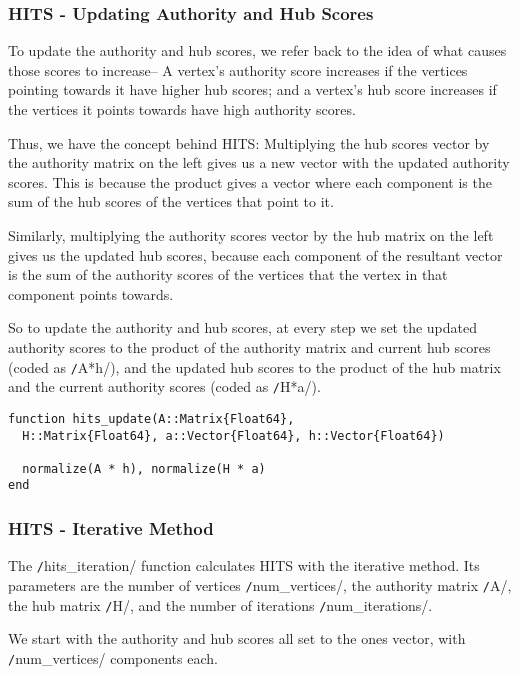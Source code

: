 \documentclass[12pt, titlepage, twoside]{amsart}
\theoremstyle{remark}
\begin{document}
\subsubsection{HITS - Updating Authority and Hub Scores}

To update the authority and hub scores, we refer back to the idea of what causes those scores to increase--
A vertex's authority score increases if the vertices pointing towards it have higher hub scores;
and a vertex's hub score increases if the vertices it points towards have high authority scores.

Thus, we have the concept behind HITS:
Multiplying the hub scores vector by the authority matrix on the left gives us a new vector with the updated authority scores.
This is because the product gives a vector where each component is the sum of the hub scores of the vertices that point to it.

Similarly, multiplying the authority scores vector by the hub matrix on the left gives us the updated hub scores,
because each component of the resultant vector is the sum of the authority scores of the vertices that the vertex in that component points towards.

So to update the authority and hub scores, at every step we set the updated authority scores to the product of the authority matrix and current hub scores (coded as \texttt/A*h/), and the updated hub scores to the product of the hub matrix and the current authority scores (coded as \texttt/H*a/).

\begin{verbatim}
function hits_update(A::Matrix{Float64}, 
  H::Matrix{Float64}, a::Vector{Float64}, h::Vector{Float64})
  
  normalize(A * h), normalize(H * a)
end
\end{verbatim}

\subsubsection{HITS - Iterative Method}

The \texttt/hits_iteration/ function calculates HITS with the iterative method.
Its parameters are the number of vertices \texttt/num_vertices/,
the authority matrix \texttt/A/, the hub matrix \texttt/H/,
and the number of iterations \texttt/num_iterations/.

We start with the authority and hub scores all set to the ones vector, with \texttt/num_vertices/ components each.
\end{document}
